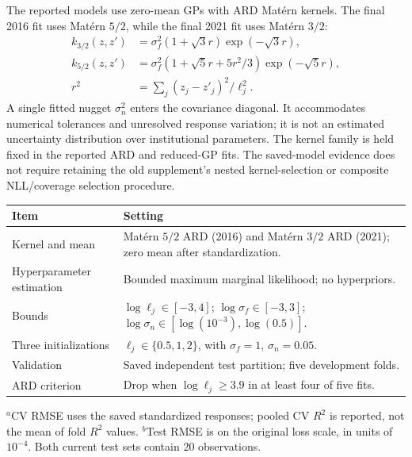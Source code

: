 \documentclass[11pt,a4paper]{article}
\begin{document}
The reported models use zero-mean GPs with ARD Mat\'ern kernels. The final
2016 fit uses Mat\'ern $5/2$, while the final 2021 fit uses Mat\'ern $3/2$:
\begin{equation}
\begin{aligned}
k_{3/2}(z,z')&=\sigma_f^2(1+\sqrt3r)\exp(-\sqrt3r),\\
k_{5/2}(z,z')&=\sigma_f^2(1+\sqrt5r+5r^2/3)\exp(-\sqrt5r),\\
r^2&=\sum_j(z_j-z'_j)^2/\ell_j^2.
\end{aligned}
\end{equation}
A single fitted nugget $\sigma_n^2$ enters the covariance diagonal.
It accommodates numerical tolerances and unresolved response variation;
it is not an estimated uncertainty distribution over institutional parameters.
The kernel family is held fixed in the reported ARD and reduced-GP fits.
The saved-model evidence does not require retaining the old supplement's
nested kernel-selection or composite NLL/coverage selection procedure.

\begin{center}
\small
\begin{tabularx}{\linewidth}{@{}lX@{}}\toprule
Item & Setting \\\midrule
Kernel and mean & Mat\'ern $5/2$ ARD (2016) and Mat\'ern $3/2$ ARD (2021); zero mean after standardization.\\
Hyperparameter estimation & Bounded maximum marginal likelihood; no hyperpriors.\\
Bounds & $\log\ell_j\in[-3,4]$; $\log\sigma_f\in[-3,3]$;
$\log\sigma_n\in[\log(10^{-3}),\log(0.5)]$.\\
Three initializations & $\ell_j\in\{0.5,1,2\}$, with $\sigma_f=1$, $\sigma_n=0.05$.\\
Validation & Saved independent test partition; five development folds.\\
ARD criterion & Drop when $\log\ell_j\ge3.9$ in at least four of five fits.\\\bottomrule
\end{tabularx}
\end{center}

\begin{center}
\label{tab:performance}
\small
\end{center}
{\footnotesize $^a$CV RMSE uses the saved standardized responses; pooled CV
$R^2$ is reported, not the mean of fold $R^2$ values.
$^b$Test RMSE is on the original loss scale, in units of $10^{-4}$.
Both current test sets contain 20 observations.}
\end{document}

